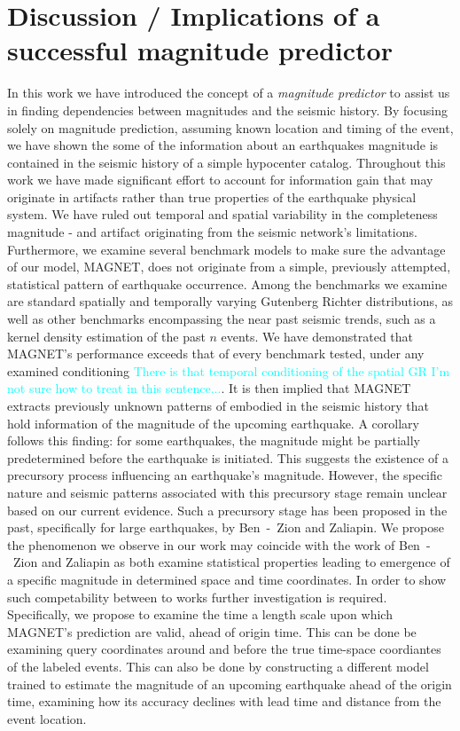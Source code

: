 \documentclass[pdflatex]{sn-jnl}
\newcommand{\neri}[1]{{\textcolor{cyan}{#1}}}
\begin{document}
\section{Discussion / Implications of a successful magnitude predictor}
In this work we have introduced the concept of a \textit{magnitude predictor} to assist us in finding dependencies between magnitudes and the seismic history.  By focusing solely on magnitude prediction, assuming known location and timing of the event, we have shown the some of the information about an earthquakes magnitude is contained in the seismic history of a simple hypocenter catalog. Throughout this work we have made significant effort to account for information gain that may originate in artifacts rather than true properties of the earthquake physical system. We have ruled out temporal and spatial variability in the completeness magnitude - and artifact originating from the seismic network's limitations. Furthermore, we examine several benchmark models to make sure the advantage of our model, MAGNET, does not originate from a simple, previously attempted, statistical pattern of earthquake occurrence. Among the benchmarks we examine are standard spatially and temporally varying Gutenberg Richter distributions, as well as other benchmarks encompassing the near past seismic trends, such as a kernel density estimation of the past $n$ events. We have demonstrated that MAGNET's performance exceeds that of every benchmark tested, under any examined conditioning \neri{There is that temporal conditioning of the spatial GR I'm not sure how to treat in this sentence...}. It is then implied that MAGNET extracts previously unknown patterns of embodied in the seismic history that hold information of the magnitude of the upcoming earthquake.
A corollary follows this finding: for some earthquakes, the magnitude might be partially predetermined before the earthquake is initiated. This suggests the existence of a precursory process influencing an earthquake's magnitude. However, the specific nature and seismic patterns associated with this precursory stage remain unclear based on our current evidence. Such a precursory stage has been proposed in the past, specifically for large earthquakes, by Ben~-~Zion and Zaliapin\cite{ben-zion_localization_2020}. We propose the phenomenon we observe in our work may coincide with the work of Ben~-~Zion and Zaliapin\cite{ben-zion_localization_2020} as both examine statistical properties leading to emergence of a specific magnitude in determined space and time coordinates. In order to show such competability between to works further investigation is required. Specifically, we propose to examine the time a length scale upon which MAGNET's prediction are valid, ahead of origin time. This can be done be examining query coordinates around and before the true time-space coordiantes  of the labeled events. This can also be done by constructing a different model trained to estimate the magnitude of an upcoming earthquake ahead of the origin time, examining how its accuracy declines with lead time and distance from the event location. 
\end{document}
